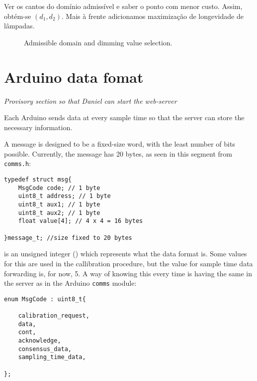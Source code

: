 \documentclass[english,fira]{ist-report}
\begin{document}
Ver os cantos do domínio admissível e saber o ponto com menor custo. Assim, obtém-se $(d_1,d_2)$. Mais à frente adicionamos maximização de longevidade de lâmpadas.
\begin{figure}[ht]
	\centering
	
	\caption{Admissible domain and dimming value selection.}
\end{figure}

\section{Arduino data fomat}

{\centering \textit{Provisory section so that Daniel can start the web-server}}

Each Arduino sends data at every sample time so that the server can store the necessary information. 

A message is designed to be a fixed-size word, with the least number of bits possible.
Currently, the message has 20 bytes, as seen in this segment from \texttt{comms.h}:
\begin{verbatim}
typedef struct msg{
    MsgCode code; // 1 byte
    uint8_t address; // 1 byte
    uint8_t aux1; // 1 byte
    uint8_t aux2; // 1 byte
    float value[4]; // 4 x 4 = 16 bytes

}message_t; //size fixed to 20 bytes
\end{verbatim}

 is an unsigned integer () which represents what the data format is.
Some values for this are used in the callibration procedure, but the value for sample time data forwarding is, for now, 5.
A way of knowing this every time is having the same  in the server as in the Arduino \texttt{comms} module:
\begin{verbatim}
enum MsgCode : uint8_t{

    calibration_request,
    data,
    cont,
    acknowledge,
    consensus_data,
    sampling_time_data,

};
\end{verbatim}
\end{document}

